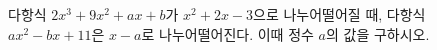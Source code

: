 다항식 $2x^3+9x^2+ax+b$가 $x^2+2x-3$으로 나누어떨어질 때, 다항식 $ax^2-bx+11$은 $x-a$로 나누어떨어진다. 이때 정수 $a$의 값을 구하시오. 
